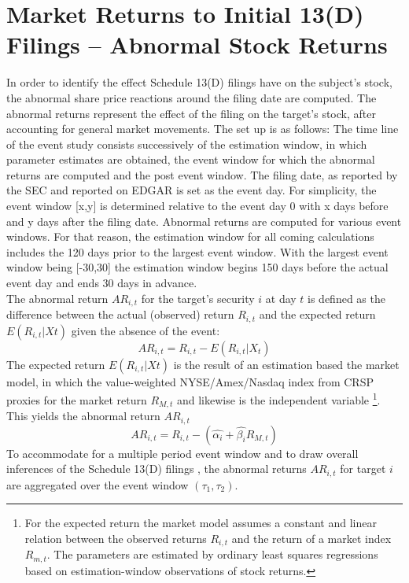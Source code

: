 \documentclass[12pt]{article}
\begin{document}
\section{Market Returns to Initial 13(D) Filings -- Abnormal Stock Returns}
In order to identify the effect Schedule 13(D) filings have on the subject's stock, the abnormal share price reactions around the filing date are computed. The abnormal returns represent the effect of the filing on the target's stock, after accounting for general market movements.
The set up is as follows: The time line of the event study consists successively of the estimation window, in which parameter estimates are obtained, the event window for which the abnormal returns are computed and the post event window. 
The filing date, as reported by the SEC and reported on EDGAR is set as the event day. For simplicity, the event window [x,y] is determined relative to the event day 0 with x days before and y days after the filing date. Abnormal returns are computed for various event windows. For that reason, the estimation window for all coming calculations includes the 120 days prior to the largest event window. With the largest event window being [-30,30] the estimation window begins 150 days before the actual event day and ends 30 days in advance.\\
The abnormal return $AR_{i,t}$ for the target's security $i$ at day $t$ is defined as the difference between the actual (observed) return $R_{i,t}$ and the expected return $E(R_{i,t}|X{t})$ given the absence of the event:
	\begin{equation}\label{eq:1}
		AR_{i,t}=R_{i,t}-E(R_{i,t}|X_{t})
	\end{equation}
The expected return $E(R_{i,t}|X{t})$ is the result of an estimation based the market model, in which the value-weighted NYSE/Amex/Nasdaq index from CRSP proxies for the market return $R_{M,t}$ and likewise is the independent variable 
	\footnote{For the expected return the market model assumes a constant and linear relation between the observed returns $R_{i,t}$ and the return of a market index $R_{m,t}$. The parameters are estimated by ordinary least squares regressions based on estimation-window observations of stock returns.}.
This yields the abnormal return $AR_{i,t}$
	\begin{equation}\label{eq:2}
		AR_{i,t}=R_{i,t}-(\hat{\alpha_{i}}+\hat{\beta_{i}}R_{M,t})
	\end{equation}
To accommodate for a multiple period event window and to draw overall inferences of the Schedule 13(D) filings \citep[p.21]{MacKinlay1997}, the abnormal returns $AR_{i,t}$ for target $i$ are aggregated over the event window $(\tau_1,\tau_2)$. 
\end{document}
